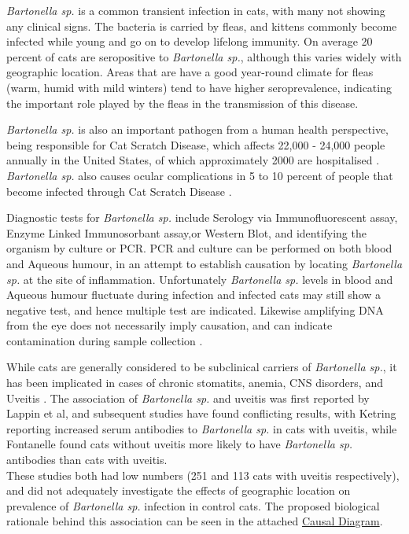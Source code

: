 \documentclass[11pt,twocolumn]{article}
\begin{document}
		\emph{Bartonella sp.} is a common transient infection in cats, with many not showing any clinical signs. 
		The bacteria is carried by fleas, and kittens commonly become infected while young and go on to develop lifelong immunity.
		On average 20 percent of cats are seropositive to \emph{Bartonella sp.}, although this varies widely with geographic location\cite{Jameson1995a}. Areas that are have a good year-round climate for fleas (warm, humid with mild winters) tend to have higher seroprevalence, indicating the important role played by the fleas in the transmission of this disease.


		\emph{Bartonella sp.} is also an important pathogen from a human health perspective, being responsible for Cat Scratch Disease, which affects 22,000 - 24,000 people annually in the United States, of which approximately 2000 are hospitalised \cite{Jackson1993}.
		\emph{Bartonella sp.} also causes ocular complications in 5 to 10 percent of people that become infected through Cat Scratch Disease \cite{Wade2000}.
	
		Diagnostic tests for \emph{Bartonella sp.} include Serology via Immunofluorescent assay, Enzyme Linked Immunosorbant assay,or Western Blot, and identifying the organism by culture or PCR.
		PCR and culture can be performed on both blood and Aqueous humour, in an attempt to establish causation by locating \emph{Bartonella sp.} at the site of inflammation. Unfortunately \emph{Bartonella sp.} levels in blood and Aqueous humour fluctuate during infection and infected cats may still show a negative test, and hence multiple test are indicated\cite{Guptill2010}. Likewise amplifying DNA from the eye does not necessarily imply causation, and can indicate contamination during sample collection \cite{Powell2010}.


		While cats are generally considered to be subclinical carriers of \emph{Bartonella sp.}, it has been implicated in cases of chronic stomatits, anemia, CNS disorders, and Uveitis \cite{Nasir2005}.
		The association of \emph{Bartonella sp.} and uveitis was first reported by Lappin et al\cite{Lappin1999}, and subsequent studies have found conflicting results, with Ketring reporting increased serum antibodies to \emph{Bartonella sp.} in cats with uveitis\cite{Ketring2004}, while Fontanelle found cats without uveitis more likely to have \emph{Bartonella sp.} antibodies than cats with uveitis.\\
		These studies both had low numbers (251 and 113 cats with uveitis respectively), and did not adequately investigate the effects of geographic location on prevalence of \emph{Bartonella sp.} infection in control cats.
		The proposed biological rationale behind this association can be seen in the attached \hyperref[fig:1]{Causal Diagram}.
	
\end{document}
